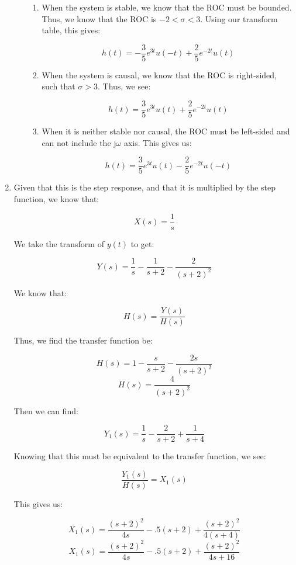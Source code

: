 \begin{enumerate}
\begin{enumerate}
        \begin{enumerate}

          \item When the system is stable, we know that the ROC must be bounded. Thus, we know that the ROC is $-2<\sigma<3$. Using our transform table, this gives:

            $$\boxed{h(t)=-\frac{3}{5}e^{3t}u(-t)+\frac{2}{5}e^{-2t}u(t)}$$

          \item When the system is causal, we know that the ROC is right-sided, such that $\sigma>3$. Thus, we see:

            $$\boxed{h(t)=\frac{3}{5}e^{3t}u(t)+\frac{2}{5}e^{-2t}u(t)}$$

          \item When it is neither stable nor causal, the ROC must be left-sided and can not include the j$\omega$ axis. This gives us:

            $$\boxed{h(t)=\frac{3}{5}e^{3t}u(t)-\frac{2}{5}e^{-2t}u(-t)}$$

        \end{enumerate}

    \end{enumerate}

  \item Given that this is the step response, and that it is multiplied by the step function, we know that:

    $$X(s)=\frac{1}{s}$$

    We take the transform of $y(t)$ to get:

    $$Y(s)=\frac{1}{s}-\frac{1}{s+2}-\frac{2}{(s+2)^2}$$

    We know that:

    $$H(s)=\frac{Y(s)}{H(s)}$$

    Thus, we find the transfer function be:

    $$H(s)=1-\frac{s}{s+2}-\frac{2s}{(s+2)^2}$$
    $$H(s)=\frac{4}{(s+2)^2}$$

    Then we can find:

    $$Y_1(s)=\frac{1}{s}-\frac{2}{s+2}+\frac{1}{s+4}$$

    Knowing that this must be equivalent to the transfer function, we see:

    $$\frac{Y_1(s)}{H(s)}=X_1(s)$$

    This gives us:

    $$X_1(s)=\frac{(s+2)^2}{4s}-.5(s+2)+\frac{(s+2)^2}{4(s+4)}$$
    $$X_1(s)=\frac{(s+2)^2}{4s}-.5(s+2)+\frac{(s+2)^2}{4s+16}$$


\end{enumerate}
